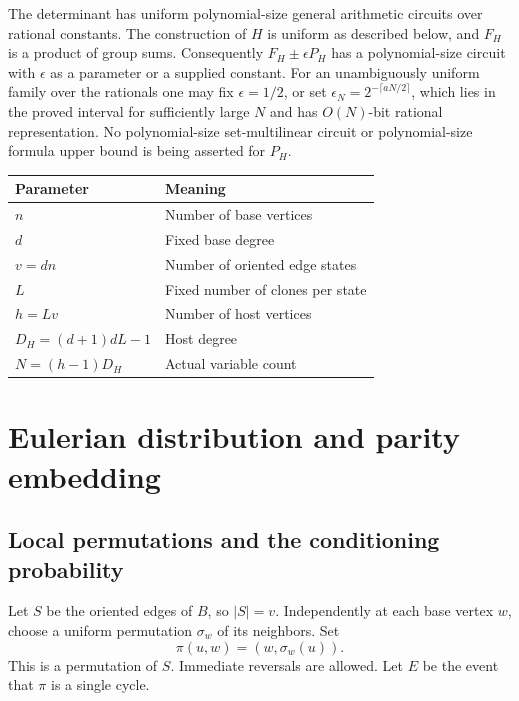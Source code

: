 \documentclass[11pt]{article}
\theoremstyle{definition}
\theoremstyle{remark}
\numberwithin{equation}{section}
\begin{document}
The determinant has uniform polynomial-size general arithmetic
circuits over rational constants. The construction of \(H\) is
uniform as described below, and \(F_H\) is a product of group sums.
Consequently \(F_H\pm\epsilon P_H\) has a polynomial-size circuit
with \(\epsilon\) as a parameter or a supplied constant.
For an unambiguously uniform family over the rationals one may
fix \(\epsilon=1/2\), or set
\(\epsilon_N=2^{-\lceil aN/2\rceil}\), which lies in the proved
interval for sufficiently large \(N\) and has \(O(N)\)-bit
rational representation.
No polynomial-size set-multilinear circuit or polynomial-size
formula upper bound is being asserted for \(P_H\).

\begin{center}
\begin{tabular}{ll}
\toprule
Parameter & Meaning\\
\midrule
\(n\) & Number of base vertices\\
\(d\) & Fixed base degree\\
\(v=dn\) & Number of oriented edge states\\
\(L\) & Fixed number of clones per state\\
\(h=Lv\) & Number of host vertices\\
\(D_H=(d+1)dL-1\) & Host degree\\
\(N=(h-1)D_H\) & Actual variable count\\
\bottomrule
\end{tabular}
\end{center}


\section{Eulerian distribution and parity embedding}\label{sec:distribution}

\subsection{Local permutations and the conditioning probability}\label{sub:cover}
Let \(S\) be the oriented edges of \(B\), so \(|S|=v\).
Independently at each base vertex \(w\), choose a uniform permutation
\(\sigma_w\) of its neighbors. Set
\begin{equation}\label{eq:4}
\pi(u,w)=(w,\sigma_w(u)).
\end{equation}
This is a permutation of \(S\). Immediate reversals are allowed.
Let \(E\) be the event that \(\pi\) is a single cycle.
\end{document}
